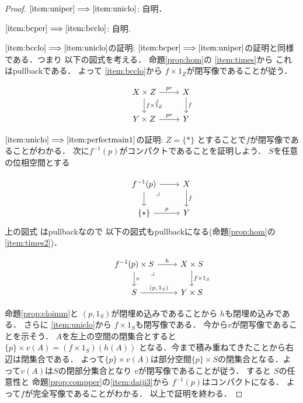 \documentclass[leqno, a4paper, 12pt, dvipdfmx]{jsarticle}
\newcommand{\To}{\Longrightarrow}
\begin{document}
\begin{proof}
$\ref{item:uniper}\To \ref{item:uniclo}$: 自明．


$\ref{item:bcper}\To \ref{item:bcclo}$: 自明.



$\ref{item:bcclo}\To \ref{item:uniclo}$の証明:
$\ref{item:bcper}\To \ref{item:uniper}$の証明と同様である．つまり
以下の図式を考える．
命題\ref{prop:hom}の
\ref{item:times}から
これはpullbackである．
よって
\ref{item:bcclo}から
$f\times 1_{Z}$が閉写像であることが従う．


\[
\begin{tikzcd}
& X\times Z \arrow[d,"f\times 1_{Z}"]  \arrow[r, "pr"]\arrow[dr, phantom, "\lrcorner", very near start] & X \arrow[d, "f"]\\
& Y\times Z \arrow[r, "pr"]& Y
\end{tikzcd}
\]







$\ref{item:uniclo}\To \ref{item:perfectmain1}$の証明:
$Z=\{*\}$
とすることで$f$が閉写像であることがわかる．
次に$f^{-1}(p)$がコンパクトであることを証明しよう．
$S$を任意の位相空間とする

\[
\begin{tikzcd}
& f^{-1}(p) \arrow[d,""]  \arrow[r, ""]\arrow[dr, phantom, "\lrcorner", very near start] & X \arrow[d, "f"]\\
& \{*\} \arrow[r, "\text{$p$}"]& Y
\end{tikzcd}
\]
上の図式
はpullbackなので
以下の図式もpullbackになる(命題\ref{prop:hom}の\ref{item:times2})．

\[
\begin{tikzcd}
& f^{-1}(p)\times S \arrow[d,"v"]  \arrow[r, "h"]\arrow[dr, phantom, "\lrcorner", very near start] & X\times S \arrow[d, "f\times 1_{S}"]\\
& S \arrow[r, "\text{$(p, 1_{S})$}"]& Y\times S
\end{tikzcd}
\]

命題\ref{prop:cloimm}と
$(p, 1_{S})$が閉埋め込みであることから
$h$も閉埋め込みである．
さらに
\ref{item:uniclo}から
$f\times 1_{S}$も閉写像である．
今から$v$が閉写像であることを示そう．
$A$を左上の空間の閉集合とすると
$\{p\}\times v(A)=(f\times 1_{S})(h(A))$
となる．今まで積み重ねてきたことから右辺は閉集合である．
よって$\{p\}\times  v(A)$は部分空間$\{p\}\times S$の閉集合となる．よって$v(A)$は$S$の閉部分集合となり
$v$が閉写像であることが従う．
すると
$S$の任意性と
命題\ref{prop:compper}の\ref{item:daiji3}から
$f^{-1}(p)$はコンパクトになる．
よって$f$が完全写像であることがわかる．
以上で証明を終わる．
\end{proof}
\end{document}
